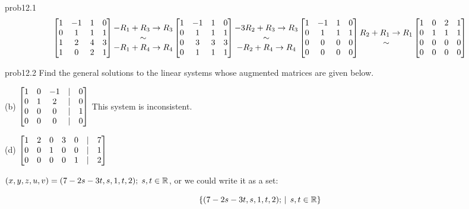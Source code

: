 \begin{sol}{prob12.1}
\soln
$$\bmatrix 
1 & -1 & 1 & 0 \\
 0 & 1 & 1 & 1 \\
 1 & 2 & 4 & 3 \\
 1 & 0 & 2 & 1\endbmatrix \begin{matrix} -R_1+R_3\to R_3 \\ \sim \\-R_1+R_4\to R_4 \end{matrix} 
\bmatrix 
1 & -1 & 1 & 0 \\
 0 & 1 & 1 & 1 \\
 0 & 3 & 3 & 3 \\
 0 & 1 & 1 & 1\endbmatrix
\begin{matrix} -3R_2+R_3\to R_3 \\ \sim \\-R_2+R_4\to R_4 \end{matrix}\bmatrix  1 & -1 & 1 & 0 \\
 0 & 1 & 1 & 1 \\
 0 & 0 & 0 & 0 \\
 0 & 0 & 0 & 0 \endbmatrix
\begin{matrix} R_2+R_1\to R_1 \\ \sim \\
 \end{matrix}\bmatrix  1 & 0 & 2 & 1 \\
 0 & 1 & 1 & 1 \\
 0 & 0 & 0 & 0 \\
 0 & 0 & 0 & 0 \endbmatrix$$
\medskip 


\end{sol}

\begin{sol}{prob12.2} Find the general solutions to the linear systems whose augmented matrices are given below.
\medskip

(b) $ \bmatrix 1 & 0 & -1 &|&0 \\
 0 & 1 & 2 &|&0\\
 0 & 0 & 0&|&1 \\
 0 & 0 & 0 &|&0\endbmatrix$
\soln This system is inconsistent.
\medskip
%

(d) $\bmatrix  1 & 2 & 0 & 3 & 0 &|& 7 \\
 0 & 0 & 1 & 0 & 0 &|& 1 \\
 0 & 0 & 0 & 0 & 1 &|& 2 \endbmatrix$

\soln $(x,y,z,u,v)=(7-2s-3t,s,1,t,2); \; s,t \in \mathbb{R}$, or we could write it as a set:

$$ \{(7-2s-3t,s,1,t,2); \,\mid \, s,t \in \mathbb{R} \} $$
\medskip



\end{sol}
